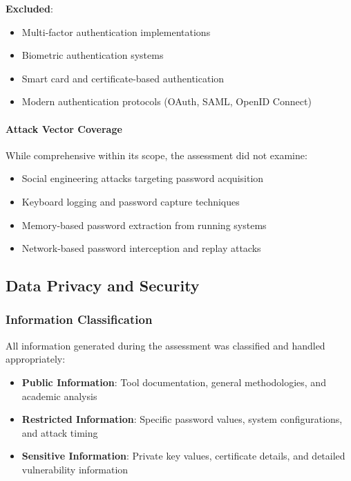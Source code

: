 \textbf{Excluded}:
\begin{itemize}
    \item Multi-factor authentication implementations
    \item Biometric authentication systems
    \item Smart card and certificate-based authentication
    \item Modern authentication protocols (OAuth, SAML, OpenID Connect)
\end{itemize}

\paragraph{Attack Vector Coverage}
While comprehensive within its scope, the assessment did not examine:
\begin{itemize}
    \item Social engineering attacks targeting password acquisition
    \item Keyboard logging and password capture techniques
    \item Memory-based password extraction from running systems
    \item Network-based password interception and replay attacks
\end{itemize}

\subsection{Data Privacy and Security}

\subsubsection{Information Classification}
All information generated during the assessment was classified and handled appropriately:

\begin{itemize}
    \item \textbf{Public Information}: Tool documentation, general methodologies, and academic analysis
    \item \textbf{Restricted Information}: Specific password values, system configurations, and attack timing
    \item \textbf{Sensitive Information}: Private key values, certificate details, and detailed vulnerability information
\end{itemize}


